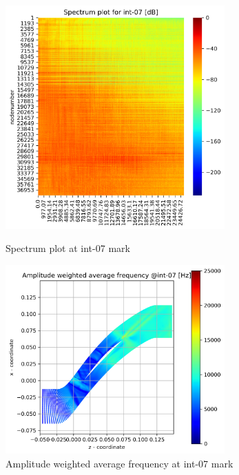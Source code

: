 \begin{figure}[ht]
  \centering
  \includegraphics[width=0.75\textwidth]{Figures/int-07_spectrum.png}
  \caption{Spectrum plot at int-07 mark} \label{int-07-spectrum}
  
  \vspace*{\floatsep}%

  \includegraphics[width=0.75\textwidth]{Figures/int-07-awaf.png}
  \caption{Amplitude weighted average frequency at int-07 mark} \label{int-07-awaf}
\end{figure}
